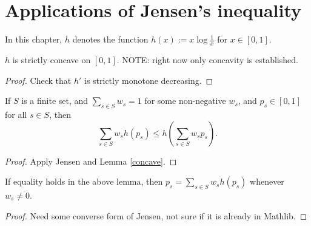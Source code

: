 \chapter{Applications of Jensen's inequality}

In this chapter, $h$ denotes the function $h(x) := x \log \frac{1}{x}$ for $x \in [0,1]$.

\begin{lemma}[Concavity]\label{concave}
  $h$ is strictly concave on $[0,1]$. NOTE: right now only concavity is established.
\end{lemma}

\begin{proof} Check that $h'$ is strictly monotone decreasing.
\end{proof}

\begin{lemma}[Jensen]\label{jensen}
   \leanok
  If $S$ is a finite set, and $\sum_{s \in S} w_s = 1$ for some non-negative $w_s$, and $p_s \in [0,1]$ for all $s \in S$, then
  $$ \sum_{s \in S} w_s h(p_s) \leq h(\sum_{s \in S} w_s p_s).$$
\end{lemma}

\begin{proof} Apply Jensen and Lemma \ref{concave}.
\end{proof}

\begin{lemma}\label{converse-jensen}
If equality holds in the above lemma, then $p_s = \sum_{s \in S} w_s h(p_s)$ whenever $w_s \neq 0$.
\end{lemma}

\begin{proof} Need some converse form of Jensen, not sure if it is already in Mathlib.
\end{proof}

